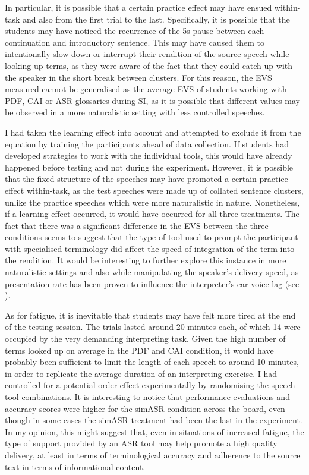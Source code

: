In particular, it is possible that a certain practice effect may have ensued within-task and also from the first trial to the last. Specifically, it is possible that the students may have noticed the recurrence of the 5s pause between each continuation and introductory sentence. This may have caused them to intentionally slow down or interrupt their rendition of the source speech while looking up terms, as they were aware of the fact that they could catch up with the speaker in the short break between clusters. For this reason, the EVS measured cannot be generalised as the average EVS of students working with PDF, CAI or ASR glossaries during SI, as it is possible that different values may be observed in a more naturalistic setting with less controlled speeches.

I had taken the learning effect into account and attempted to exclude it from the equation by training the participants ahead of data collection. If students had developed strategies to work with the individual tools, this would have already happened before testing and not during the experiment. However, it is possible that the fixed structure of the speeches may have promoted a certain practice effect within-task, as the test speeches were made up of collated sentence clusters, unlike the practice speeches which were more naturalistic in nature. Nonetheless, if a learning effect occurred, it would have occurred for all three treatments. The fact that there was a significant difference in the EVS between the three conditions seems to suggest that the type of tool used to prompt the participant with specialised terminology did affect the speed of integration of the term into the rendition. It would be interesting to further explore this instance in more naturalistic settings and also while manipulating the speaker's delivery speed, as presentation rate has been proven to influence the interpreter's ear-voice lag (see \citealt{barik_simultaneous_1973,lee_ear_2002}).

As for fatigue, it is inevitable that students may have felt more tired at the end of the testing session. The trials lasted around 20 minutes each, of which 14 were occupied by the very demanding interpreting task. Given the high number of terms looked up on average in the PDF and CAI condition, it would have probably been sufficient to limit the length of each speech to around 10 minutes, in order to replicate the average duration of an interpreting exercise. I had controlled for a potential order effect experimentally by randomising the speech-tool combinations. It is interesting to notice that performance evaluations and accuracy scores were higher for the simASR condition across the board, even though in some cases the simASR treatment had been the last in the experiment. In my opinion, this might suggest that, even in situations of increased fatigue, the type of support provided by an ASR tool may help promote a high quality delivery, at least in terms of terminological accuracy and adherence to the source text in terms of informational content.

